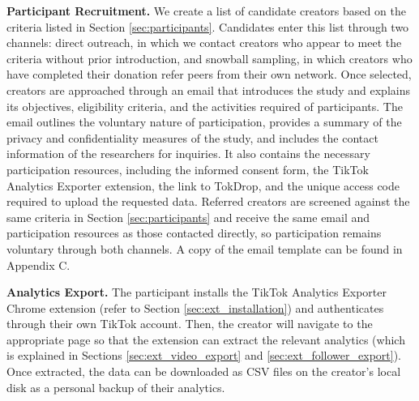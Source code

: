 \textbf{Participant Recruitment.} We create a list of candidate creators based on the criteria listed in Section \ref{sec:participants}. Candidates enter this list through two channels: direct outreach, in which we contact creators who appear to meet the criteria without prior introduction, and snowball sampling, in which creators who have completed their donation refer peers from their own network. Once selected, creators are approached through an email that introduces the study and explains its objectives, eligibility criteria, and the activities required of participants. The email outlines the voluntary nature of participation, provides a summary of the privacy and confidentiality measures of the study, and includes the contact information of the researchers for inquiries. It also contains the necessary participation resources, including the informed consent form, the TikTok Analytics Exporter extension, the link to TokDrop, and the unique access code required to upload the requested data. Referred creators are screened against the same criteria in Section \ref{sec:participants} and receive the same email and participation resources as those contacted directly, so participation remains voluntary through both channels. A copy of the email template can be found in Appendix C.

\textbf{Analytics Export.} The participant installs the TikTok Analytics Exporter Chrome extension (refer to Section \ref{sec:ext_installation}) and authenticates through their own TikTok account. Then, the creator will navigate to the appropriate page so that the extension can extract the relevant analytics (which is explained in Sections \ref{sec:ext_video_export} and \ref{sec:ext_follower_export}). Once extracted, the data can be downloaded as CSV files on the creator's local disk as a personal backup of their analytics.


